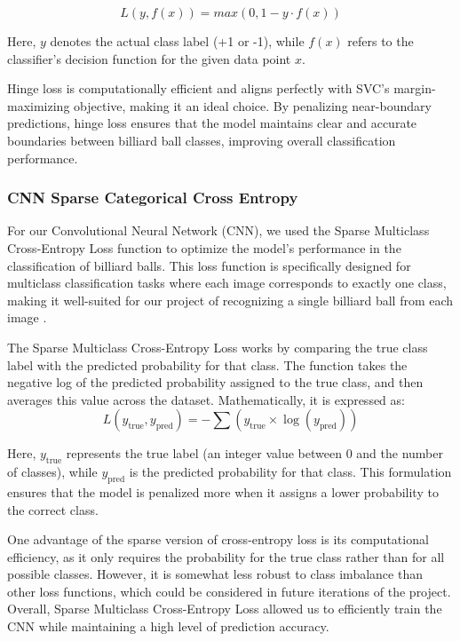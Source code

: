 \documentclass{article}
\begin{document}
\begin{equation}
    L(y, f(x)) = max(0, 1-y \cdot f(x))
\end{equation}

Here, $y$ denotes the actual class label (+1 or -1), while $f(x)$ refers to the classifier's decision function for the given data point $x$.

Hinge loss is computationally efficient and aligns perfectly with SVC's margin-maximizing objective, making it an ideal choice. By penalizing near-boundary predictions, hinge loss ensures that the model maintains clear and accurate boundaries between billiard ball classes, improving overall classification performance. \cite{unknownMachineLearningApproach2023, bartlettClassificationRejectOption2008}

\subsubsection*{CNN Sparse Categorical Cross Entropy}
\label{sec:cnn_sparse_categorical_cross_entropy}
For our Convolutional Neural Network (CNN), we used the Sparse Multiclass Cross-Entropy Loss function to optimize the model’s performance in the classification of billiard balls. This loss function is specifically designed for multiclass classification tasks where each image corresponds to exactly one class, making it well-suited for our project of recognizing a single billiard ball from each image \cite{jeevaLossFunctionsNeural2023}.

The Sparse Multiclass Cross-Entropy Loss works by comparing the true class label with the predicted probability for that class. The function takes the negative log of the predicted probability assigned to the true class, and then averages this value across the dataset. Mathematically, it is expressed as:
\begin{equation}
    L(y_{\text{true}}, y_{\text{pred}}) = - \sum (y_{\text{true}} \times \log(y_{\text{pred}}))
\end{equation}

Here, $y_{\text{true}}$ represents the true label (an integer value between 0 and the number of classes), while $y_{\text{pred}}$ is the predicted probability for that class. This formulation ensures that the model is penalized more when it assigns a lower probability to the correct class\cite{jeevaLossFunctionsNeural2023}.

One advantage of the sparse version of cross-entropy loss is its computational efficiency, as it only requires the probability for the true class rather than for all possible classes. However, it is somewhat less robust to class imbalance than other loss functions, which could be considered in future iterations of the project. Overall, Sparse Multiclass Cross-Entropy Loss allowed us to efficiently train the CNN while maintaining a high level of prediction accuracy.
\end{document}
